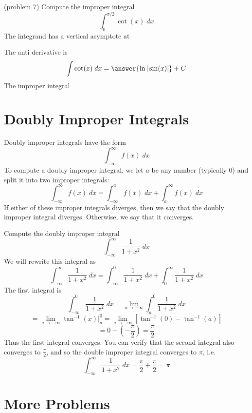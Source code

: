 \documentclass{ximera}
\begin{document}
 \begin{problem}(problem 7)
Compute the improper integral
\[
\int_0^{\pi/2} \cot(x) \; dx
\]
The integrand has a vertical asymptote at
\begin{multipleChoice}
\end{multipleChoice}
The anti derivative is
\[
\int \cot(x) \; dx = \answer{\ln|\sin(x)|} + C
\]
The improper integral
\begin{multipleChoice}
\end{multipleChoice}
\end{problem}


\section{Doubly Improper Integrals}

Doubly improper integrals have the form 
\[
\int_{-\infty}^\infty f(x) \; dx
\]
To compute a doubly improper integral, we let $a$ be any number (typically 0) and split it into two improper integrals:
\[
\int_{-\infty}^\infty f(x) \; dx = \int_{-\infty}^a f(x) \; dx + \int_a^\infty f(x) \; dx
\]
If either of these improper integrals diverges, then we say that the doubly improper integral diverges.
Otherwise, we say that it converges.

\begin{example}[example 8]
Compute the doubly improper integral
\[
\int_{-\infty}^\infty \frac{1}{1+x^2} \; dx
\]
We will rewrite this integral as
\[
\int_{-\infty}^\infty \frac{1}{1+x^2} \; dx = \int_{-\infty}^0 \frac{1}{1+x^2} \; dx + \int_0^\infty \frac{1}{1+x^2} \; dx
\] 
The first integral is
\[
\int_{-\infty}^0 \frac{1}{1+x^2} \; dx = \lim_{a \to -\infty} \int_{a}^0 \frac{1}{1+x^2} \; dx
\]
\[
= \lim_{a \to -\infty} \tan^{-1}(x) \bigg|_a^0 = \lim_{a \to -\infty} \left[\tan^{-1}(0) - \tan^{-1}(a)\right]
\]
\[
= 0 - \left(-\frac{\pi}{2}\right) = \frac{\pi}{2}
\]
Thus the first integral converges. You can verify that the second integral also converges to $\frac{\pi}{2}$,
and so the double improper integral converges to $\pi$, i.e.
\[
\int_{-\infty}^\infty \frac{1}{1+x^2} \; dx = \frac{\pi}{2} + \frac{\pi}{2} = \pi
\]

\end{example}


\section{More Problems}
\end{document}

